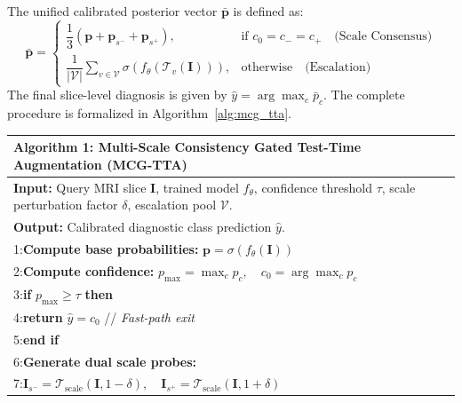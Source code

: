 The unified calibrated posterior vector $\bar{\mathbf{p}}$ is defined as:
\begin{equation}
\bar{\mathbf{p}} = \begin{cases}
\dfrac{1}{3}\left(\mathbf{p} + \mathbf{p}_{s^-} + \mathbf{p}_{s^+}\right), & \text{if } c_0 = c_- = c_+ \quad \text{(Scale Consensus)} \\[1.5ex]
\dfrac{1}{|\mathcal{V}|} \sum_{v \in \mathcal{V}} \sigma\left(f_\theta(\mathcal{T}_v(\mathbf{I}))\right), & \text{otherwise} \quad \text{(Escalation)}
\end{cases}
\label{eq:mcg_aggregation}
\end{equation}
The final slice-level diagnosis is given by $\hat{y} = \arg\max_c \bar{p}_c$. The complete procedure is formalized in Algorithm~\ref{alg:mcg_tta}.

\begin{table}[h]
\centering
\begin{tabular}{p{}}
\toprule
\textbf{Algorithm 1: Multi-Scale Consistency Gated Test-Time Augmentation (MCG-TTA)} \\
\midrule
\textbf{Input:} Query MRI slice $\mathbf{I}$, trained model $f_\theta$, confidence threshold $\tau$, scale perturbation factor $\delta$, escalation pool $\mathcal{V}$. \\
\textbf{Output:} Calibrated diagnostic class prediction $\hat{y}$. \\
\midrule
1:\hspace{1em}\textbf{Compute base probabilities:} $\mathbf{p} = \sigma(f_\theta(\mathbf{I}))$ \\
2:\hspace{1em}\textbf{Compute confidence:} $p_{\max} = \max_c p_c, \quad c_0 = \arg\max_c p_c$ \\
3:\hspace{1em}\textbf{if} $p_{\max} \ge \tau$ \textbf{then} \\
4:\hspace{2em}\textbf{return} $\hat{y} = c_0$ \hfill // \emph{Fast-path exit} \\
5:\hspace{1em}\textbf{end if} \\
6:\hspace{1em}\textbf{Generate dual scale probes:} \\
7:\hspace{2em}$\mathbf{I}_{s^-} = \mathcal{T}_{\text{scale}}(\mathbf{I}, 1 - \delta), \quad \mathbf{I}_{s^+} = \mathcal{T}_{\text{scale}}(\mathbf{I}, 1 + \delta)$ \\

\end{tabular}
\end{table}

